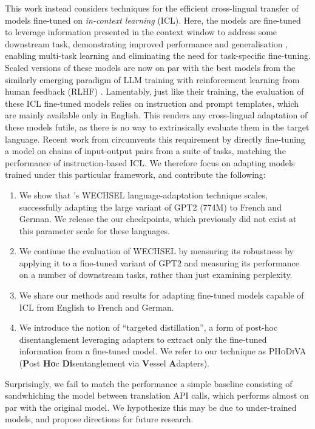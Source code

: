 \documentclass[11pt]{article}
\begin{document}
This work instead considers techniques for the efficient cross-lingual transfer of models fine-tuned
on \textit{in-context learning} (ICL). Here, the models are fine-tuned to leverage information
presented in the context window to address some downstream task, demonstrating improved performance
and generalisation \citep{wei_finetuned_2021,sanh_multitask_2022,wang_benchmarking_2022}, enabling
multi-task learning and eliminating the need for task-specific fine-tuning. Scaled versions of these
models \citep{chung_scaling_2022} are now on par with the best models from the similarly emerging
paradigm of LLM training with reinforcement learning from human feedback (RLHF)
\citep{ouyang_training_2022}. Lamentably, just like their training, the evaluation of these ICL
fine-tuned models relies on instruction and prompt templates, which are mainly available only in
English. This renders any cross-lingual adaptation of these models futile, as there is no way to
extrinsically evaluate them in the target language. Recent work from \citet{min_metaicl_2022}
circumvents this requirement by directly fine-tuning a model on chains of input-output pairs from
a suite of tasks, matching the performance of instruction-based ICL. We therefore focus on adapting
models trained under this particular framework, and contribute the following:
\begin{enumerate}
	\item We show that \citet{minixhofer_wechsel_2022}'s WECHSEL language-adaptation technique scales,
	      successfully adapting the large variant of GPT2 (774M) to French and German. We release the our
	      checkpoints, which previously did not exist at this parameter scale for these languages.
	\item We continue the evaluation of WECHSEL by measuring its robustness by applying it to
	      a fine-tuned variant of GPT2 and measuring its performance on a number of downstream tasks,
	      rather than just examining perplexity.
	\item We share our methods and results for adapting fine-tuned models capable of ICL from English to
	      French and German.
	\item We introduce the notion of ``targeted distillation'', a form of post-hoc disentanglement
	      leveraging adapters \citep{houlsby_parameter-efficient_2019} to extract only the fine-tuned
	      information from a fine-tuned model.  We refer to our technique as \textsc{PHoDiVA}
	      (\textbf{P}ost \textbf{Ho}c \textbf{Di}sentanglement via \textbf{V}essel \textbf{A}dapters).
\end{enumerate}
Surprisingly, we fail to match the performance a simple baseline consisting of sandwhiching the
model between translation API calls, which performs almost on par with the original model. We
hypothesize this may be due to under-trained models, and propose directions for future research.
\end{document}
